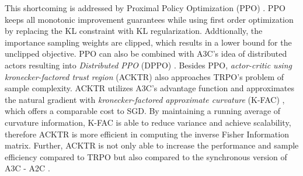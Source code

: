     This shortcoming is addressed by Proximal Policy Optimization (PPO) \cite{Schulman2017}.
    PPO keeps all monotonic improvement guarantees while using first order optimization by replacing the KL constraint with KL regularization.
    Addtionally, the importance sampling weights are  clipped, which results in a lower bound for the unclipped objective.
    PPO can also be combined with A3C's idea of distributed actors resulting into \textit{Distributed PPO} (DPPO) \cite{Heess2017}. 
    Besides PPO, \textit{actor-critic using kronecker-factored trust region} (ACKTR) \cite{Wu2017} also approaches TRPO's problem of sample complexity.
    ACKTR utilizes A3C's advantage function and approximates the natural gradient with \textit{kronecker-factored approximate curvature} (K-FAC) \cite{Grosse2016,Martens2015}, which offers a comparable cost to SGD. 
    By maintaining a running average of curvature information, K-FAC is able to reduce variance and achieve scalability, therefore ACKTR is more efficient in computing the inverse Fisher Information matrix. 
    Further, ACKTR is not only able to increase the performance and sample efficiency compared to TRPO but also compared to the synchronous version of A3C - A2C \cite{Mnih2016}. 
	
